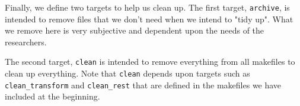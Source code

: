 Finally, we define two targets to help us clean up. The first target,
\texttt{archive}, is intended to remove files that we don't need when
we intend to "tidy up". What we remove here is very subjective and
dependent upon the needs of the researchers. 

The second target, \texttt{clean} is intended to remove everything
from all makefiles to clean up everything. Note that \texttt{clean}
depends upon targets such as \texttt{clean_transform} and
\texttt{clean_rest} that are defined in the makefiles we have included
at the beginning. 

